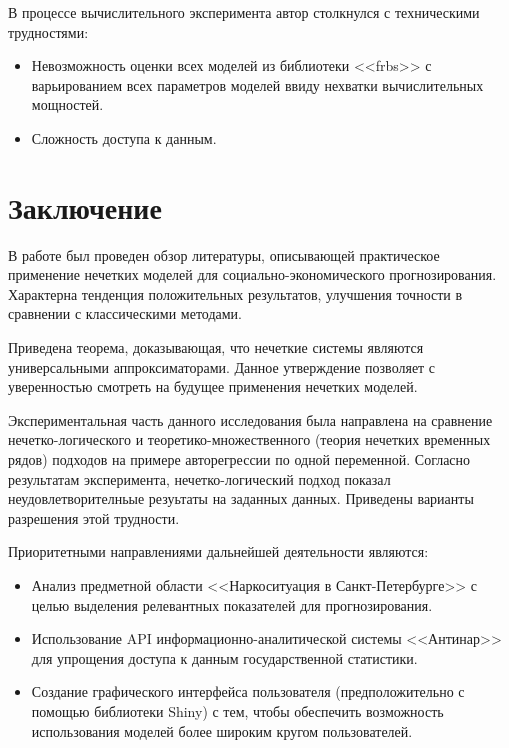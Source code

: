 В процессе вычислительного эксперимента автор столкнулся с техническими трудностями:
\begin{itemize}
	\item Невозможность оценки всех моделей из библиотеки <<frbs>> с варьированием всех параметров моделей ввиду нехватки вычислительных мощностей.
	\item Сложность доступа к данным.  
\end{itemize}
	


\newpage
\section*{Заключение}
В работе был проведен обзор литературы, описывающей практическое применение нечетких моделей для социально-экономического прогнозирования. Характерна тенденция положительных результатов, улучшения точности в сравнении с классическими методами.

Приведена теорема, доказывающая, что нечеткие системы являются универсальными аппроксиматорами. Данное утверждение позволяет с уверенностью смотреть на будущее применения нечетких моделей.

Экспериментальная часть данного исследования была направлена на сравнение нечетко-логического и теоретико-множественного (теория нечетких временных рядов) подходов на примере авторегрессии по одной переменной. Согласно результатам эксперимента, нечетко-логический подход показал неудовлетворителньые резуьтаты на заданных данных. Приведены варианты разрешения этой трудности.

Приоритетными направлениями дальнейшей деятельности являются:
\begin{itemize}
	\item Анализ предметной области <<Наркоситуация в Санкт-Петербурге>> с целью выделения релевантных показателей для прогнозирования.
	\item Использование API информационно-аналитической системы <<Антинар>> для упрощения доступа к данным государственной статистики.
	\item Создание графического интерфейса пользователя (предположительно с помощью библиотеки Shiny) с тем, чтобы обеспечить возможность использования моделей более широким кругом пользователей.
	 
	
\end{itemize}

